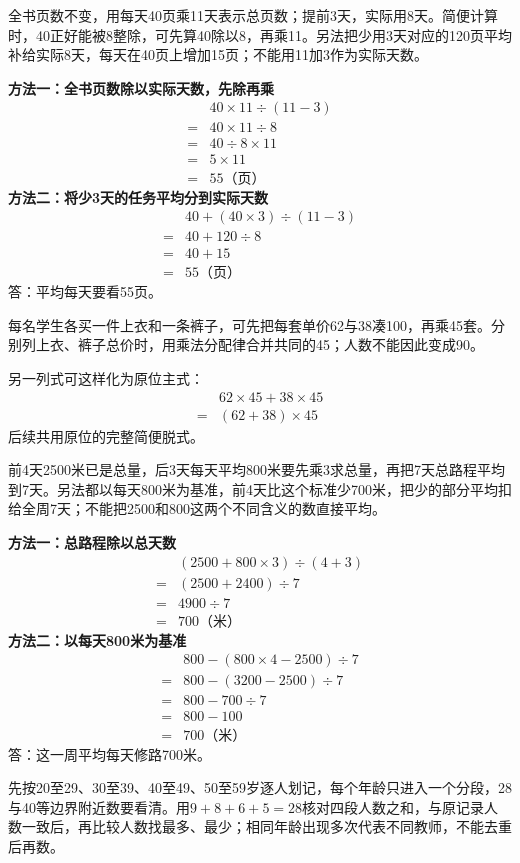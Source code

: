\documentclass[multi=snippet,border=0pt]{standalone}
\newenvironment{snippet}[3]{\begin{minipage}{#1bp}\color{answerred}\fontsize{#2}{#3}\selectfont\raggedright}{\end{minipage}}
\begin{document}
\begin{snippet}{505}{11.5}{14}全书页数不变，用每天40页乘11天表示总页数；提前3天，实际用8天。简便计算时，40正好能被8整除，可先算40除以8，再乘11。另法把少用3天对应的120页平均补给实际8天，每天在40页上增加15页；不能用11加3作为实际天数。\par \textbf{方法一：全书页数除以实际天数，先除再乘}\[\begin{aligned}&40\times11\div(11-3)\\={}&40\times11\div8\\={}&40\div8\times11\\={}&5\times11\\={}&55\text{（页）}\end{aligned}\]\textbf{方法二：将少3天的任务平均分到实际天数}\[\begin{aligned}&40+(40\times3)\div(11-3)\\={}&40+120\div8\\={}&40+15\\={}&55\text{（页）}\end{aligned}\]答：平均每天要看55页。\end{snippet}
\begin{snippet}{505}{11.5}{14}每名学生各买一件上衣和一条裤子，可先把每套单价62与38凑100，再乘45套。分别列上衣、裤子总价时，用乘法分配律合并共同的45；人数不能因此变成90。\par 另一列式可这样化为原位主式：\[\begin{aligned}&62\times45+38\times45\\={}&(62+38)\times45\end{aligned}\]后续共用原位的完整简便脱式。\end{snippet}
\begin{snippet}{505}{11.5}{14}前4天2500米已是总量，后3天每天平均800米要先乘3求总量，再把7天总路程平均到7天。另法都以每天800米为基准，前4天比这个标准少700米，把少的部分平均扣给全周7天；不能把2500和800这两个不同含义的数直接平均。\par \textbf{方法一：总路程除以总天数}\[\begin{aligned} &(2500+800\times3)\div(4+3)\\={}&(2500+2400)\div7\\={}&4900\div7\\={}&700\text{（米）}\end{aligned}\]\textbf{方法二：以每天800米为基准}\[\begin{aligned} &800-(800\times4-2500)\div7\\={}&800-(3200-2500)\div7\\={}&800-700\div7\\={}&800-100\\={}&700\text{（米）}\end{aligned}\]答：这一周平均每天修路700米。\end{snippet}
\begin{snippet}{505}{11.5}{14}先按20至29、30至39、40至49、50至59岁逐人划记，每个年龄只进入一个分段，28与40等边界附近数要看清。用\(9+8+6+5=28\)核对四段人数之和，与原记录人数一致后，再比较人数找最多、最少；相同年龄出现多次代表不同教师，不能去重后再数。\end{snippet}
\end{document}
